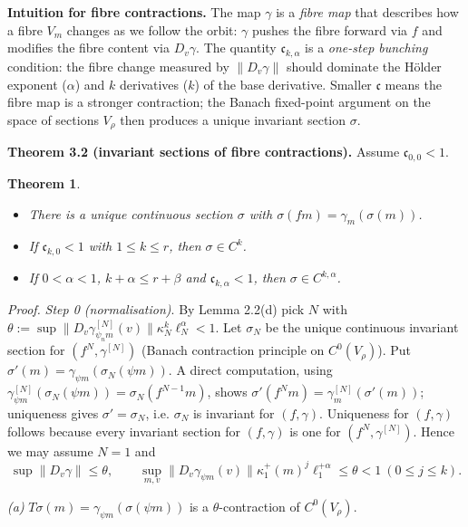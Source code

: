 \documentclass[11pt,a4paper]{article}
\theoremstyle{plain}
\newtheorem{theorem}{Theorem}[section]
\theoremstyle{definition}
\theoremstyle{remark}
\numberwithin{equation}{section}
\numberwithin{figure}{section}
\begin{document}
\textbf{Intuition for fibre contractions.} The map $\gamma$ is a \textit{fibre map} that describes how a fibre $V_m$ changes as we follow the orbit: $\gamma$ pushes the fibre forward via $f$ and modifies the fibre content via $D_v\gamma$. The quantity $\mathfrak c_{k,\alpha}$ is a \textit{one-step bunching} condition: the fibre change measured by $\|D_v\gamma\|$ should dominate the Hölder exponent ($\alpha$) and $k$ derivatives ($k$) of the base derivative. Smaller $\mathfrak c$ means the fibre map is a stronger contraction; the Banach fixed-point argument on the space of sections $V_\rho$ then produces a unique invariant section $\sigma$.

\textbf{Theorem 3.2 (invariant sections of fibre contractions).} Assume $\mathfrak c_{0,0}<1$.

\begin{theorem}
\begin{itemize}
    \item[(a)] There is a unique continuous section $\sigma$ with $\sigma(fm)=\gamma_m(\sigma(m))$.
    \item[(b)] If $\mathfrak c_{k,0}<1$ with $1\le k\le r$, then $\sigma\in C^k$.
    \item[(c)] If $0<\alpha<1$, $k+\alpha\le r+\beta$ and $\mathfrak c_{k,\alpha}<1$, then $\sigma\in C^{k,\alpha}$.
\end{itemize}
\end{theorem}

\textit{Proof.} \textit{Step 0 (normalisation)}. By Lemma 2.2(d) pick $N$ with $\theta:=\sup\|D_v\gamma^{[N]}_{\psi_nm}(v)\|\kappa_N^k\ell_N^\alpha<1$. Let $\sigma_N$ be the unique continuous invariant section for $(f^N,\gamma^{[N]})$ (Banach contraction principle on $C^0(V_\rho)$). Put $\sigma'(m)=\gamma_{\psi m}(\sigma_N(\psi m))$. A direct computation, using $\gamma^{[N]}_{\psi m}(\sigma_N(\psi m))=\sigma_N(f^{N-1}m)$, shows $\sigma'(f^Nm)=\gamma^{[N]}_m(\sigma'(m))$; uniqueness gives $\sigma'=\sigma_N$, i.e. $\sigma_N$ is invariant for $(f,\gamma)$. Uniqueness for $(f,\gamma)$ follows because every invariant section for $(f,\gamma)$ is one for $(f^N,\gamma^{[N]})$. Hence we may assume $N=1$ and
\[
\sup\|D_v\gamma\|\le\theta,\qquad\sup_{m,v}\|D_v\gamma_{\psi m}(v)\|\kappa_1^+(m)^j\ell_1^{+\alpha}\le\theta<1\ (0\le j\le k).
\]

\textit{(a)} $T\sigma(m)=\gamma_{\psi m}(\sigma(\psi m))$ is a $\theta$-contraction of $C^0(V_\rho)$.
\end{document}
